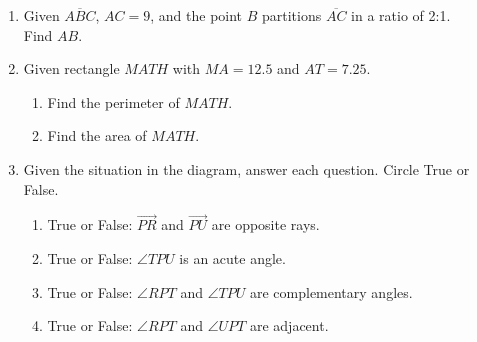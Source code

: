 \begin{enumerate}
\item Given $\overline{ABC}$, $AC=9$, and the point $B$ partitions $\overline{AC}$ in a ratio of 2:1.\\[0.5cm] Find ${AB}$. \\[0.5cm]
     \vspace{3cm}

\item Given rectangle $MATH$ with $MA=12.5$ and $AT=7.25$.
  \begin{enumerate}
    \item Find the perimeter of $MATH$. \vspace{2cm}
    \item Find the area of $MATH$.
  \end{enumerate}

\newpage
\item Given the situation in the diagram, answer each question. Circle True or False. \vspace{1cm}
    \begin{flushright}
    \end{flushright}
  \begin{enumerate}
    \item True or False: $\overrightarrow{PR}$ and $\overrightarrow{PU}$ are opposite rays.\bigskip
    \item True or False: $\angle TPU$ is an acute angle.\bigskip
    \item True or False: $\angle RPT$ and $\angle TPU$ are complementary angles.\bigskip
    \item True or False: $\angle RPT$ and $\angle UPT$ are adjacent. \bigskip
  \end{enumerate}


\end{enumerate}
